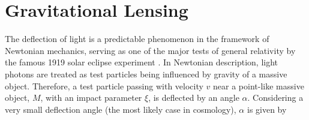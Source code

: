 \documentclass[paper=a4, fontsize=11pt]{scrartcl} %
\numberwithin{equation}{section} %
\numberwithin{figure}{section} %
\numberwithin{table}{section} %
\begin{document}



 





\newpage
\section{Gravitational Lensing} 
\label{sec:Gravitational lensing}
The deflection of light is a predictable phenomenon in the framework of Newtonian mechanics, serving as one of the major tests of general relativity by the famous 1919 solar eclipse experiment \citep[][]{Eddington+1919}. In Newtonian description, light photons are treated as test particles being influenced by gravity of a massive object. Therefore, a test particle passing with velocity $v$ near a point-like massive object, $M$, with an impact parameter $\xi$, is deflected by an angle $\alpha$. Considering a very small deflection angle (the most likely case in cosmology), $\alpha$ is given by
\end{document}
